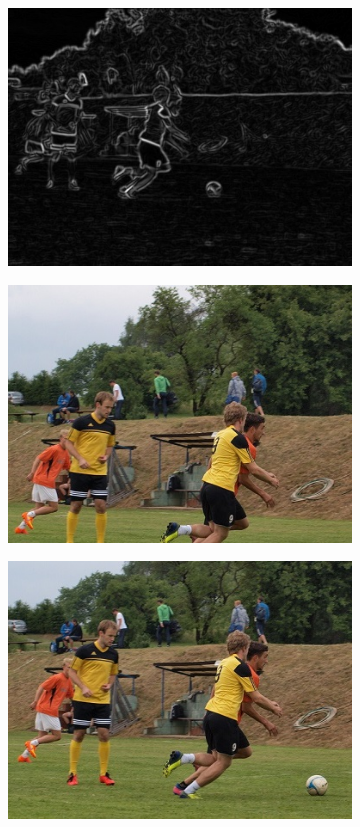 \begin{figure}[H]
\begin{subfigure}{.32\textwidth}
      \includegraphics[scale=1.0]{obrazky/gradientfotbal1.jpg}
      \caption{}
    \end{subfigure}
    \vspace{2pt}
    
    \begin{subfigure}{0.3\textwidth}
      \centering
      \includegraphics[scale=1.0]{obrazky/crop2fotbal1.jpg}
      \caption{}
    \end{subfigure}
    \begin{subfigure}{.3\textwidth}
      \centering
      \includegraphics[scale=1.0]{obrazky/crop2fotbal1-simplicity.jpg}
      \caption{}
    \end{subfigure}
    

\end{figure}
